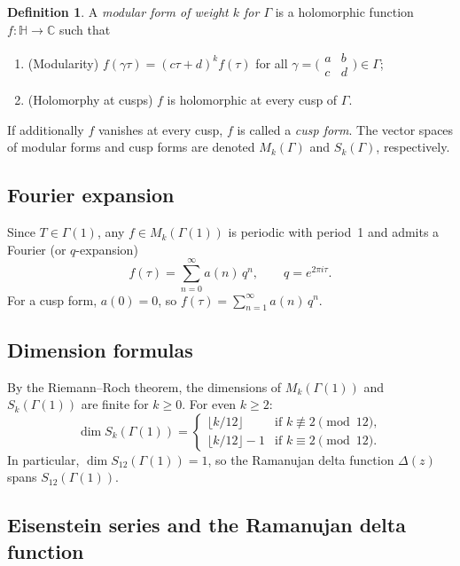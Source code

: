 \documentclass[12pt,a4paper]{amsart}
\theoremstyle{definition}
\newtheorem{definition}[theorem]{Definition}
\begin{document}
\begin{definition}
A \emph{modular form of weight $k$ for $\Gamma$} is a holomorphic function
$f \colon \mathbb{H} \to \mathbb{C}$ such that
\begin{enumerate}[label=(\roman*)]
  \item (Modularity) $f(\gamma \tau) = (c\tau+d)^k f(\tau)$ for all
        $\gamma = \bigl(\begin{smallmatrix}a&b\\c&d\end{smallmatrix}\bigr) \in \Gamma$;
  \item (Holomorphy at cusps) $f$ is holomorphic at every cusp of $\Gamma$.
\end{enumerate}
If additionally $f$ vanishes at every cusp, $f$ is called a \emph{cusp form}.
The vector spaces of modular forms and cusp forms are denoted $M_k(\Gamma)$
and $S_k(\Gamma)$, respectively.
\end{definition}

\subsection{Fourier expansion}

Since $T \in \Gamma(1)$, any $f \in M_k(\Gamma(1))$ is periodic with period~1
and admits a Fourier (or $q$-expansion)
\[
  f(\tau) = \sum_{n=0}^{\infty} a(n)\, q^n, \qquad q = e^{2\pi i\tau}.
\]
For a cusp form, $a(0) = 0$, so $f(\tau) = \sum_{n=1}^{\infty} a(n)\, q^n$.

\subsection{Dimension formulas}

By the Riemann--Roch theorem, the dimensions of $M_k(\Gamma(1))$ and
$S_k(\Gamma(1))$ are finite for $k \ge 0$. For even $k \ge 2$:
\[
  \dim S_k(\Gamma(1)) = \begin{cases}
    \lfloor k/12 \rfloor & \text{if } k \not\equiv 2 \pmod{12}, \\
    \lfloor k/12 \rfloor - 1 & \text{if } k \equiv 2 \pmod{12}.
  \end{cases}
\]
In particular, $\dim S_{12}(\Gamma(1)) = 1$, so the Ramanujan delta function
$\Delta(z)$ spans $S_{12}(\Gamma(1))$.

\subsection{Eisenstein series and the Ramanujan delta function}
\end{document}
